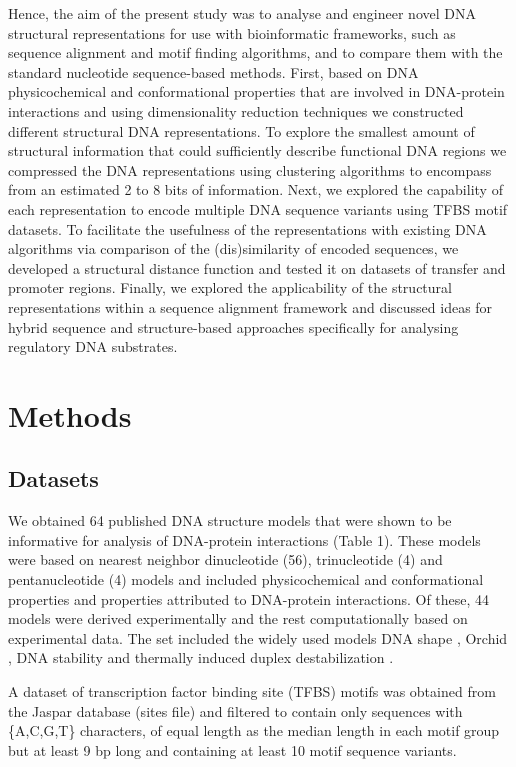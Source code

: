 \documentclass[sigconf]{acmart}
\begin{document}
Hence, the aim of the present study was to analyse and engineer novel DNA structural representations for use with bioinformatic frameworks, such as sequence alignment and motif finding algorithms, and to compare them with the standard nucleotide sequence-based methods. First, based on DNA physicochemical and conformational properties that are involved in DNA-protein interactions and using dimensionality reduction techniques we constructed different structural DNA representations. To explore the smallest amount of structural information that could sufficiently describe functional DNA regions we compressed the DNA representations using clustering algorithms to encompass from an estimated 2 to 8 bits of information. Next, we explored the capability of each representation to encode multiple DNA sequence variants using TFBS motif datasets. To facilitate the usefulness of the representations with existing DNA algorithms via comparison of the (dis)similarity of encoded sequences, we developed a structural distance function and tested it on datasets of transfer and promoter regions. Finally, we explored the applicability of the structural representations within a sequence alignment framework and discussed ideas for hybrid sequence and structure-based approaches specifically for analysing regulatory DNA substrates.


\section{Methods}
\subsection{Datasets}
We obtained 64 published DNA structure models that were shown to be informative for analysis of DNA-protein interactions \cite{Zrimec2020-wx} (Table 1). These models were based on nearest neighbor dinucleotide (56), trinucleotide (4) and pentanucleotide (4) models and included physicochemical and conformational properties and properties attributed to DNA-protein interactions. Of these, 44 models were derived experimentally and the rest computationally based on experimental data. The set included the widely used models DNA shape \cite{Rohs2009-hm,Chiu2016-kb}, Orchid \cite{Bishop2011-jm}, DNA stability and thermally induced duplex destabilization \cite{SantaLucia1998-hc,Zrimec2015-xf}. 

A dataset of transcription factor binding site (TFBS) motifs was obtained from the Jaspar database \cite{Khan2018-wj} (sites file) and filtered to contain only sequences with \{A,C,G,T\} characters, of equal length as the median length in each motif group but at least 9 bp long and containing at least 10 motif sequence variants.
\end{document}
